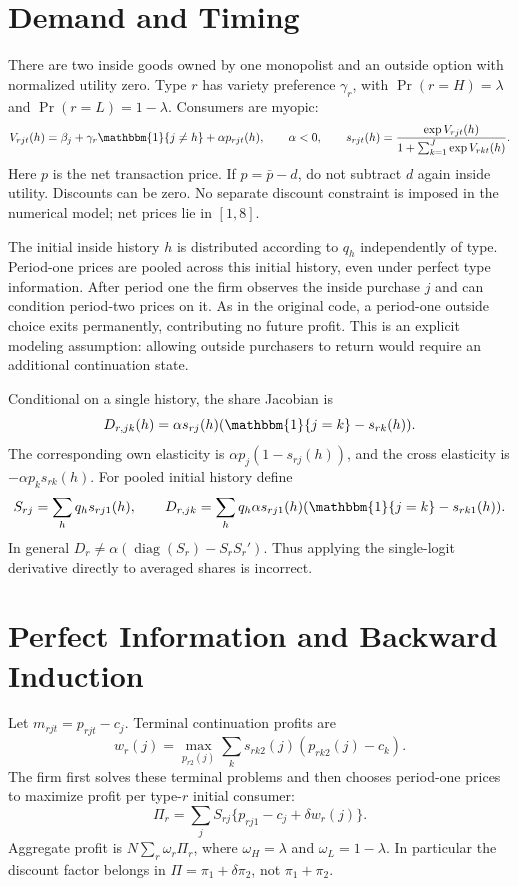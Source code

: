 \documentclass[12pt]{article}
\theoremstyle{definition}
\theoremstyle{remark}
\newcommand{\ind}{\mathbbm{1}}
\numberwithin{equation}{section}
\begin{document}
\section{Demand and Timing}
There are two inside goods owned by one monopolist and an outside option with
normalized utility zero. Type $r$ has variety preference $\gamma_r$, with
$\Pr(r=H)=\lambda$ and $\Pr(r=L)=1-\lambda$. Consumers are myopic:
\[
 V_{rjt}(h)=\beta_j+\gamma_r\ind\{j\ne h\}+\alpha p_{rjt}(h),
 \qquad \alpha<0,\qquad
 s_{rjt}(h)=\frac{\exp V_{rjt}(h)}{1+\sum_{k=1}^J\exp V_{rkt}(h)}.
\]
Here $p$ is the net transaction price. If $p=\bar p-d$, do not subtract $d$
again inside utility. Discounts can be zero. No separate discount constraint
is imposed in the numerical model; net prices lie in $[1,8]$.

The initial inside history $h$ is distributed according to $q_h$ independently
of type. Period-one prices are pooled across this initial history, even under
perfect type information. After period one the firm observes the inside
purchase $j$ and can condition period-two prices on it. As in the original
code, a period-one outside choice exits permanently, contributing no future
profit. This is an explicit modeling assumption: allowing outside purchasers
to return would require an additional continuation state.

Conditional on a single history, the share Jacobian is
\[
 D_{r,jk}(h)=\alpha s_{rj}(h)(\ind\{j=k\}-s_{rk}(h)).
\]
The corresponding own elasticity is $\alpha p_j(1-s_{rj}(h))$, and the cross
elasticity is $-\alpha p_k s_{rk}(h)$. For pooled initial history define
\[
 S_{rj}=\sum_h q_hs_{rj1}(h),\qquad
 D_{r,jk}=\sum_hq_h\alpha s_{rj1}(h)(\ind\{j=k\}-s_{rk1}(h)).
\]
In general $D_r\ne\alpha(\operatorname{diag}(S_r)-S_rS_r')$.
Thus applying the single-logit derivative directly to averaged shares is incorrect.

\section{Perfect Information and Backward Induction}
Let $m_{rjt}=p_{rjt}-c_j$. Terminal continuation profits are
\[
 w_r(j)=\max_{p_{r2}(j)}\sum_k s_{rk2}(j)(p_{rk2}(j)-c_k).
\]
The firm first solves these terminal problems and then chooses period-one
prices to maximize profit per type-$r$ initial consumer:
\[
 \Pi_r=\sum_j S_{rj}\{p_{rj1}-c_j+\delta w_r(j)\}.
\]
Aggregate profit is $N\sum_r\omega_r\Pi_r$, where
$\omega_H=\lambda$ and $\omega_L=1-\lambda$. In particular the discount factor
belongs in $\Pi=\pi_1+\delta\pi_2$, not $\pi_1+\pi_2$.
\end{document}
